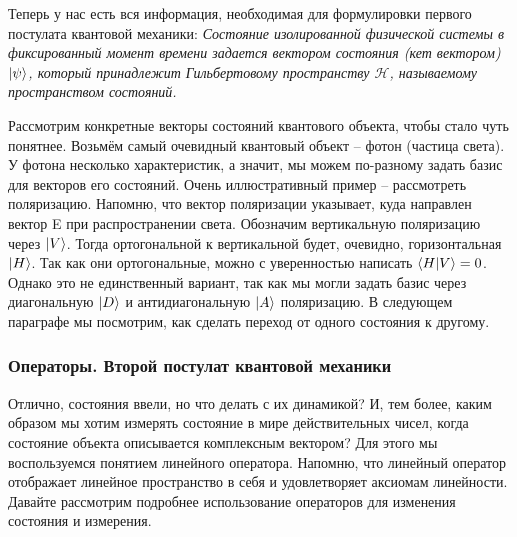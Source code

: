 Теперь у нас есть вся информация, необходимая для формулировки первого постулата квантовой механики: \textit{Состояние изолированной физической системы в фиксированный момент времени задается вектором состояния (кет вектором) $\ket{\psi}$, который принадлежит Гильбертовому пространству $\mathcal{H}$, называемому пространством состояний.}

Рассмотрим конкретные векторы состояний квантового объекта, чтобы стало чуть понятнее. Возьмём самый очевидный квантовый объект -- фотон (частица света). У фотона несколько характеристик, а значит, мы можем по-разному задать базис для векторов его состояний. Очень иллюстративный пример -- рассмотреть поляризацию. Напомню, что вектор поляризации указывает, куда направлен вектор E при распространении света. Обозначим вертикальную поляризацию через $\ket{V}$. Тогда ортогональной к вертикальной будет, очевидно, горизонтальная $\ket{H}$. Так как они ортогональные, можно с уверенностью написать $\bra{H}\ket{V} = 0$. Однако это не единственный вариант, так как мы могли задать базис через диагональную $\ket{D}$ и антидиагональную $\ket{A}$ поляризацию. В следующем параграфе мы посмотрим, как сделать переход от одного состояния к другому.

\subsubsection*{Операторы. Второй постулат квантовой механики}

\hspace{1em} Отлично, состояния ввели, но что делать с их динамикой? И, тем более, каким образом мы хотим измерять состояние в мире действительных чисел, когда состояние объекта описывается комплексным вектором? Для этого мы воспользуемся понятием линейного оператора. Напомню, что линейный оператор отображает линейное пространство в себя и удовлетворяет аксиомам линейности. Давайте рассмотрим подробнее использование операторов для изменения состояния и измерения.

